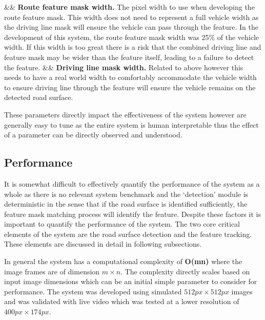 \documentclass[]{aiaa-tc}%
\begin{document}
\begin{easylist}
	&& \textbf{Route feature mask width.} The pixel width to use when developing the route feature mask. This width does not need to represent a full vehicle width as the driving line mask will ensure the vehicle can pass through the feature. In the development of this system, the route feature mask width was 25\% of the vehicle width. If this width is too great there is a risk that the combined driving line and feature mask may be wider than the feature itself, leading to a failure to detect the feature.
	&& \textbf{Driving line mask width.} Related to above however this needs to have a real world width to comfortably accommodate the vehicle width to ensure driving line through the feature will ensure the vehicle remains on the detected road surface.
\end{easylist}

These parameters directly impact the effectiveness of the system however are generally easy to tune as the entire system is human interpretable thus the effect of a parameter can be directly observed and understood.

\subsection{Performance} \label{s:performance}

It is somewhat difficult to effectively quantify the performance of the system as a whole as there is no relevant system benchmark and the `detection' module is deterministic in the sense that if the road surface is identified sufficiently, the feature mask matching process will identify the feature. Despite these factors it is important to quantify the performance of the system. The two core critical elements of the system are the road surface detection and the feature tracking. These elements are discussed in detail in following subsections.

In general the system has a computational complexity of \textbf{O(mn)} where the image frames are of dimension $m\times n$. The complexity directly scales based on input image dimensions which can be an initial simple parameter to consider for performance. The system was developed using simulated $512px \times 512px$ images and was validated with live video which was tested at a lower resolution of $400px \times 174px$.
\end{document}
